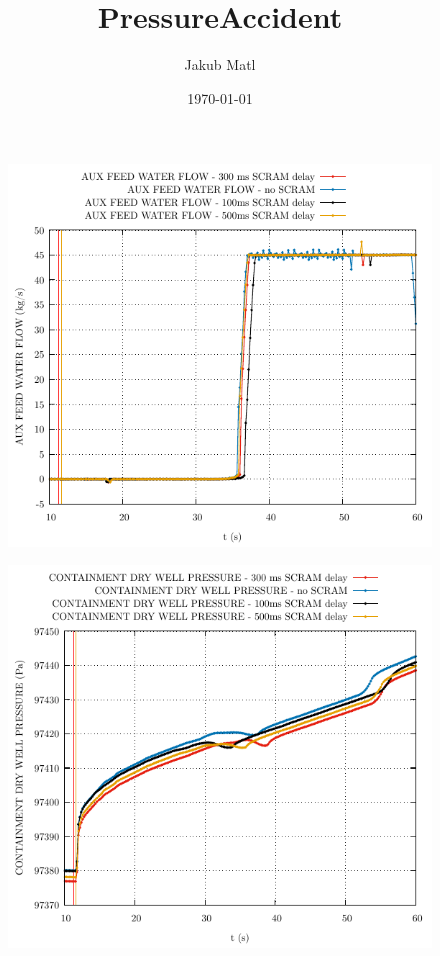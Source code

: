\documentclass{article}
\title{PressureAccident}
\author{Jakub Matl}
\date{\today}
\begin{document}
\maketitle
\begin{multicols}{2}
\begin{figure}[H]
\centering
\includegraphics[width=\columnwidth]{./graphs/AUX FEED WATER FLOW_comp.pdf}
\end{figure}
\begin{figure}[H]
\centering
\includegraphics[width=\columnwidth]{./graphs/CONTAINMENT DRY WELL PRESSURE_comp.pdf}

\end{figure}
\end{multicols}
\end{document}
